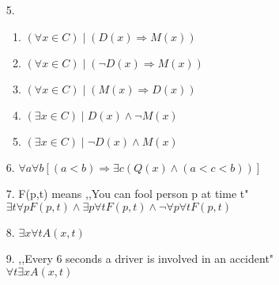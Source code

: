 \documentclass[11pt]{exam}
\begin{document}
\begin{enumerate}[leftmargin=0pt]
\item[5.]
\begin{enumerate}[label=(\alph*)]
    \item $(\forall x \in C) \mid (D(x) \Rightarrow M(x))$
    \item $(\forall x \in C) \mid (\neg D(x) \Rightarrow M(x))$
    \item $(\forall x \in C) \mid (M(x) \Rightarrow D(x))$
    \item $(\exists x \in C) \mid D(x) \land \neg M(x)$
    \item $(\exists x \in C) \mid \neg D(x) \land M(x)$
\end{enumerate}

\item[6.] $\forall a \forall b [(a < b) \Rightarrow \exists c (Q(x) \land (a < c < b))]$

\item[7.] F(p,t) means ,,You can fool person p at time t" \\
$\exists t \forall p F(p,t) \land \exists p \forall t F(p,t) \land \neg \forall p \forall t F(p,t)$

\item[8.] $\exists x \forall t A(x,t)$

\item[9.] ,,Every 6 seconds a driver is involved in an accident" \\
$\forall t \exists x A(x,t)$

\end{enumerate}
\end{document}
